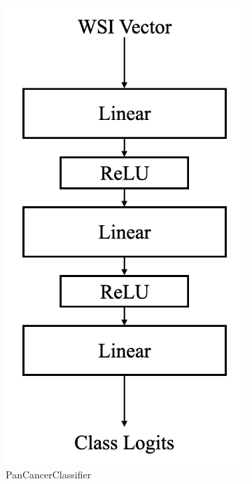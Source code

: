 \documentclass{l4proj}
\begin{document}
\begin{figure}[]
\begin{subfigure}[b]{0.3\textwidth}
        \includegraphics[width=\textwidth]{images/pancancerclassifier.png}
        \caption{PanCancerClassifier}
        \label{fig:pancancerclassifier}
    \end{subfigure}
    \quad
    \begin{subfigure}[b]{0.3\textwidth}

\end{subfigure}
\end{figure}
\end{document}

